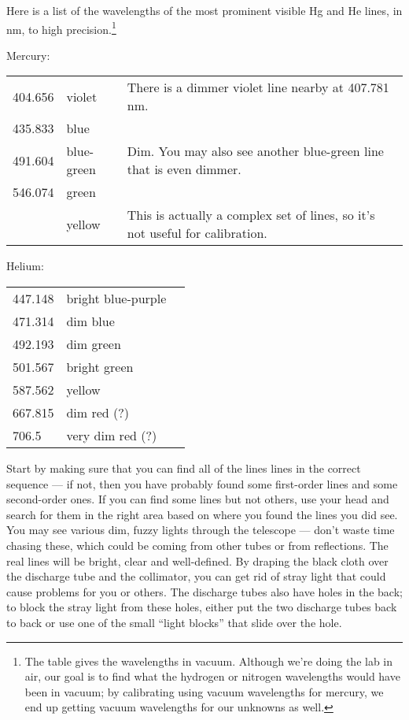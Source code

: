 Here is a list of the wavelengths of the most prominent visible Hg and He lines, in nm, to high 
precision.\footnote{The table gives the wavelengths in vacuum. Although we're doing the lab in air, our goal is to find
what the hydrogen or nitrogen wavelengths would have been in vacuum; by calibrating using vacuum wavelengths
for mercury, we end up getting vacuum wavelengths for our unknowns as well.}

Mercury:\\
\noindent\begin{tabular}{llp{40mm}}
404.656  & violet & There is a dimmer violet line nearby at 407.781 nm.\\
435.833  & blue & \\
491.604  & blue-green & Dim. You may also see another blue-green line that is even dimmer. \\
546.074  & green & \\
         & yellow & This is actually a complex set of lines, so it's not useful for calibration.
\end{tabular}

Helium:\\
\noindent\begin{tabular}{llp{40mm}}
447.148 & bright blue-purple & \\
471.314 & dim blue & \\
492.193 & dim green & \\
501.567 & bright green & \\
587.562 & yellow & \\
667.815 & dim red (?) & \\
706.5 & very dim red (?)
\end{tabular}

Start by making sure
that you can find all of the lines lines in the correct sequence --- if
not, then you have probably found some first-order
lines and some second-order ones. If you can find some lines
but not others, use your head and search for them in the
right area based on where you found the lines you did see.
You may see various dim, fuzzy lights through the telescope
--- don't waste time chasing these, which could be coming
from other tubes or from reflections. The real lines will be
bright, clear and well-defined. By draping the black cloth over
the discharge tube and the collimator, you can get rid of stray
light that could cause problems for you or others. The discharge tubes also have
holes in the back; to block the stray
light from these holes, either put the two discharge tubes back
to back or use one of the small ``light blocks'' that slide over the hole.

